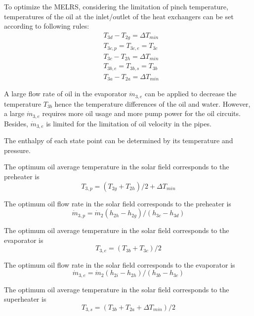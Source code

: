 To optimize the MELRS, considering the limitation of pinch temperature, temperatures of the oil at the inlet/outlet of the heat exchangers can be set according to following rules:
\begin{eqnarray*}
	&T_{3d} - T_{2g} = \Delta T_{min}\\
   &T_{3c,p} = T_{3c,e} = T_{3c}\\
   &T_{3c} - T_{2h} = \Delta T_{min}\\
	&T_{3b,e} = T_{3b,s} = T_{3b}\\
	&T_{3a} - T_{2a} = \Delta T_{min}
\end{eqnarray*}


A large flow rate of oil in the evaporator $\dot{m}_{3,e}$ can be applied to decrease the temperature $T_{3b}$ hence the temperature differences of the oil and water. However, a large $\dot{m}_{3,e}$ requires more oil usage and more pump power for the oil circuits. Besides, $\dot{m}_{3,e}$ is limited for the limitation of oil velocity in the pipes.

The enthalpy of each state point can be determined by its temperature and pressure.

The optimum oil average temperature in the solar field corresponds to the preheater is
\begin{equation}
  T_{3,p} = (T_{2g} + T_{2h})/2 + \Delta T_{min}
\end{equation}

The optimum oil flow rate in the solar field corresponds to the preheater is
\begin{equation}
  \dot{m}_{3,p} = \dot{m}_{2}(h_{2h} - h_{2g})/(h_{3c} - h_{3d})
\end{equation}

The optimum oil average temperature in the solar field corresponds to the evaporator is
\begin{equation}
  T_{3,e} = (T_{3b} + T_{3c})/2
\end{equation}

The optimum oil flow rate in the solar field corresponds to the evaporator is
\begin{equation}
  \dot{m}_{3,e} = \dot{m}_{2}(h_{2i} - h_{2h})/(h_{3b} - h_{3c})
  \label{eq:m_3e}
\end{equation}

The optimum oil average temperature in the solar field corresponds to the superheater is
\begin{equation}
  T_{3,s} = (T_{3b} + T_{2a} + \Delta T_{min})/2
\end{equation}

